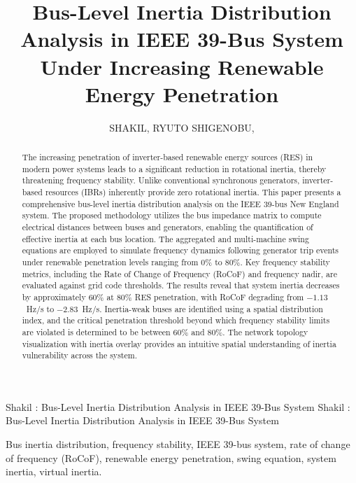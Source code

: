 \documentclass[]{ieeeaccess}
\begin{document}

\title{Bus-Level Inertia Distribution Analysis in IEEE 39-Bus System Under Increasing Renewable Energy Penetration}

\author{
\uppercase{Shakil},
\uppercase{Ryuto Shigenobu},
\address[1]{Department of Electrical and Electronic Engineering, University of Fukui, Fukui, Japan}
}

\markboth
{Shakil \headeretal: Bus-Level Inertia Distribution Analysis in IEEE 39-Bus System}
{Shakil \headeretal: Bus-Level Inertia Distribution Analysis in IEEE 39-Bus System}

\begin{abstract}
The increasing penetration of inverter-based renewable energy sources (RES) in modern power systems leads to a significant reduction in rotational inertia, thereby threatening frequency stability. Unlike conventional synchronous generators, inverter-based resources (IBRs) inherently provide zero rotational inertia. This paper presents a comprehensive bus-level inertia distribution analysis on the IEEE 39-bus New England system. The proposed methodology utilizes the bus impedance matrix to compute electrical distances between buses and generators, enabling the quantification of effective inertia at each bus location. The aggregated and multi-machine swing equations are employed to simulate frequency dynamics following generator trip events under renewable penetration levels ranging from 0\% to 80\%. Key frequency stability metrics, including the Rate of Change of Frequency (RoCoF) and frequency nadir, are evaluated against grid code thresholds. The results reveal that system inertia decreases by approximately 60\% at 80\% RES penetration, with RoCoF degrading from $-1.13$~Hz/s to $-2.83$~Hz/s. Inertia-weak buses are identified using a spatial distribution index, and the critical penetration threshold beyond which frequency stability limits are violated is determined to be between 60\% and 80\%. The network topology visualization with inertia overlay provides an intuitive spatial understanding of inertia vulnerability across the system.
\end{abstract}

\begin{keywords}
Bus inertia distribution, frequency stability, IEEE 39-bus system, rate of change of frequency (RoCoF), renewable energy penetration, swing equation, system inertia, virtual inertia.
\end{keywords}
\end{document}
